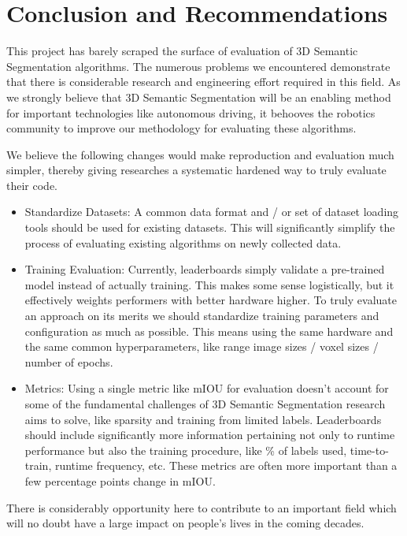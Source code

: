 \section{Conclusion and Recommendations}
\label{chap:conclusion}

This project has barely scraped the surface of evaluation of 3D Semantic Segmentation algorithms. The numerous problems we encountered demonstrate that there is considerable research and engineering effort required in this field. As we strongly believe that 3D Semantic Segmentation will be an enabling method for important technologies like autonomous driving, it behooves the robotics community to improve our methodology for evaluating these algorithms.

We believe the following changes would make reproduction and evaluation much simpler, thereby giving researches a systematic hardened way to truly evaluate their code.

\begin{itemize}
  \item Standardize Datasets: A common data format and / or set of dataset loading tools should be used for existing datasets. This will significantly simplify the process of evaluating existing algorithms on newly collected data.
  \item Training Evaluation: Currently, leaderboards simply validate a pre-trained model instead of actually training. This makes some sense logistically, but it effectively weights performers with better hardware higher. To truly evaluate an approach on its merits we should standardize training parameters and configuration as much as possible. This means using the same hardware and the same common hyperparameters, like range image sizes / voxel sizes / number of epochs.
  \item Metrics: Using a single metric like mIOU for evaluation doesn't account for some of the fundamental challenges of 3D Semantic Segmentation research aims to solve, like sparsity and training from limited labels. Leaderboards should include significantly more information pertaining not only to runtime performance but also the training procedure, like \% of labels used, time-to-train, runtime frequency, etc. These metrics are often more important than a few percentage points change in mIOU.
\end{itemize}

There is considerably opportunity here to contribute to an important field which will no doubt have a large impact on people's lives in the coming decades.

\newpage
